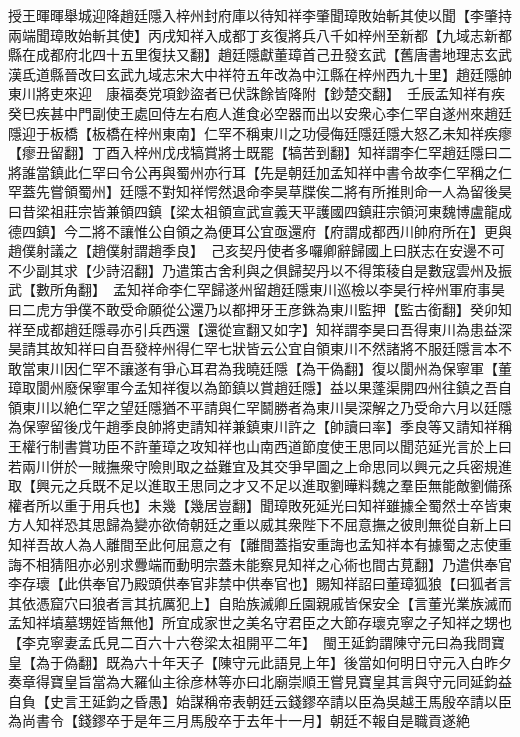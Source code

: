授王暉暉舉城迎降趙廷隱入梓州封府庫以待知祥李肇聞璋敗始斬其使以聞【李肇持兩端聞璋敗始斬其使】丙戌知祥入成都丁亥復將兵八千如梓州至新都【九域志新都縣在成都府北四十五里復扶又翻】趙廷隱獻董璋首己丑發玄武【舊唐書地理志玄武漢氐道縣晉改曰玄武九域志宋大中祥符五年改為中江縣在梓州西九十里】趙廷隱帥東川將吏來迎　康福奏党項鈔盜者已伏誅餘皆降附【鈔楚交翻】　壬辰孟知祥有疾癸巳疾甚中門副使王處回侍左右庖人進食必空器而出以安衆心李仁罕自遂州來趙廷隱迎于板橋【板橋在梓州東南】仁罕不稱東川之功侵侮廷隱廷隱大怒乙未知祥疾瘳【瘳丑留翻】丁酉入梓州戊戌犒賞將士既罷【犒苦到翻】知祥謂李仁罕趙廷隱曰二將誰當鎮此仁罕曰令公再與蜀州亦行耳【先是朝廷加孟知祥中書令故李仁罕稱之仁罕蓋先嘗領蜀州】廷隱不對知祥愕然退命李昊草牒俟二將有所推則命一人為留後昊曰昔梁祖莊宗皆兼領四鎮【梁太祖領宣武宣義天平護國四鎮莊宗領河東魏博盧龍成德四鎮】今二將不讓惟公自領之為便耳公宜亟還府【府謂成都西川帥府所在】更與趙僕射議之【趙僕射謂趙季良】　己亥契丹使者多囉卿辭歸國上曰朕志在安邊不可不少副其求【少詩沼翻】乃遣策古舍利與之俱歸契丹以不得策稜自是數寇雲州及振武【數所角翻】　孟知祥命李仁罕歸遂州留趙廷隱東川巡檢以李昊行梓州軍府事昊曰二虎方爭僕不敢受命願從公還乃以都押牙王彦銖為東川監押【監古銜翻】癸卯知祥至成都趙廷隱尋亦引兵西還【還從宣翻又如字】知祥謂李昊曰吾得東川為患益深昊請其故知祥曰自吾發梓州得仁罕七狀皆云公宜自領東川不然諸將不服廷隱言本不敢當東川因仁罕不讓遂有爭心耳君為我曉廷隱【為干偽翻】復以閬州為保寧軍【董璋取閬州廢保寧軍今孟知祥復以為節鎮以賞趙廷隱】益以果蓬渠開四州往鎮之吾自領東川以絶仁罕之望廷隱猶不平請與仁罕鬬勝者為東川昊深解之乃受命六月以廷隱為保寧留後戊午趙季良帥將吏請知祥兼鎮東川許之【帥讀曰率】季良等又請知祥稱王權行制書賞功臣不許董璋之攻知祥也山南西道節度使王思同以聞范延光言於上曰若兩川併於一賊撫衆守險則取之益難宜及其交爭早圖之上命思同以興元之兵密規進取【興元之兵既不足以進取王思同之才又不足以進取劉曄料魏之羣臣無能敵劉備孫權者所以重于用兵也】未幾【幾居豈翻】聞璋敗死延光曰知祥雖據全蜀然士卒皆東方人知祥恐其思歸為變亦欲倚朝廷之重以威其衆陛下不屈意撫之彼則無從自新上曰知祥吾故人為人離間至此何屈意之有【離間蓋指安重誨也孟知祥本有據蜀之志使重誨不相猜阻亦必别求釁端而動明宗蓋未能察見知祥之心術也間古莧翻】乃遣供奉官李存瓌【此供奉官乃殿頭供奉官非禁中供奉官也】賜知祥詔曰董璋狐狼【曰狐者言其依憑窟穴曰狼者言其抗厲犯上】自貽族滅卿丘園親戚皆保安全【言董光業族滅而孟知祥墳墓甥姪皆無他】所宜成家世之美名守君臣之大節存瓌克寧之子知祥之甥也【李克寧妻孟氏見二百六十六卷梁太祖開平二年】　閩王延鈞謂陳守元曰為我問寶皇【為于偽翻】既為六十年天子【陳守元此語見上年】後當如何明日守元入白昨夕奏章得寶皇旨當為大羅仙主徐彦林等亦曰北廟崇順王嘗見寶皇其言與守元同延鈞益自負【史言王延鈞之昏愚】始謀稱帝表朝廷云錢鏐卒請以臣為吳越王馬殷卒請以臣為尚書令【錢鏐卒于是年三月馬殷卒于去年十一月】朝廷不報自是職貢遂絶

